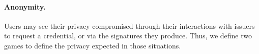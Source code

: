


\paragraph{Anonymity.} %
Users may see their privacy compromised through their interactions with issuers
to request a credential, or via the signatures they produce. Thus, we define two
games to define the privacy expected in those situations.

